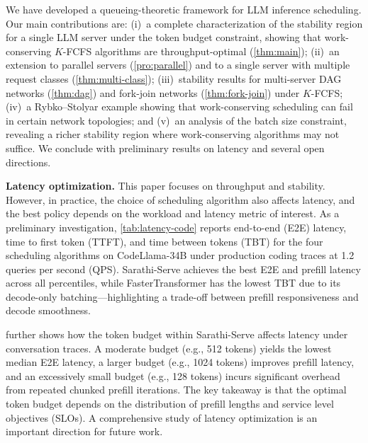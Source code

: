 \documentclass[11pt]{article}
\theoremstyle{plain}
\theoremstyle{definition}
\theoremstyle{remark}
\begin{document}
We have developed a queueing-theoretic framework for LLM inference scheduling. Our main contributions are: (i)~a complete characterization of the stability region for a single LLM server under the token budget constraint, showing that work-conserving $K$-FCFS algorithms are throughput-optimal (\cref{thm:main}); (ii)~an extension to parallel servers (\cref{pro:parallel}) and to a single server with multiple request classes (\cref{thm:multi-class}); (iii)~stability results for multi-server DAG networks (\cref{thm:dag}) and fork-join networks (\cref{thm:fork-join}) under $K$-FCFS; (iv)~a Rybko--Stolyar example showing that work-conserving scheduling can fail in certain network topologies; and (v)~an analysis of the batch size constraint, revealing a richer stability region where work-conserving algorithms may not suffice. We conclude with preliminary results on latency and several open directions.

\textbf{Latency optimization.}
This paper focuses on throughput and stability. However, in practice, the choice of scheduling algorithm also affects latency, and the best policy depends on the workload and latency metric of interest. As a preliminary investigation, \cref{tab:latency-code} reports end-to-end (E2E) latency, time to first token (TTFT), and time between tokens (TBT) for the four scheduling algorithms on CodeLlama-34B under production coding traces at 1.2 queries per second (QPS). Sarathi-Serve achieves the best E2E and prefill latency across all percentiles, while FasterTransformer has the lowest TBT due to its decode-only batching---highlighting a trade-off between prefill responsiveness and decode smoothness.

 further shows how the token budget within Sarathi-Serve affects latency under conversation traces. A moderate budget (e.g., 512 tokens) yields the lowest median E2E latency, a larger budget (e.g., 1024 tokens) improves prefill latency, and an excessively small budget (e.g., 128 tokens) incurs significant overhead from repeated chunked prefill iterations. The key takeaway is that the optimal token budget depends on the distribution of prefill lengths and service level objectives (SLOs). A comprehensive study of latency optimization is an important direction for future work.
\end{document}
